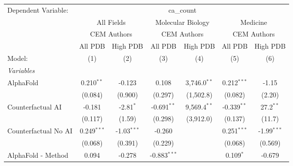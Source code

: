 \begingroup
\centering
\begin{tabular}{lcccccc}
   \tabularnewline \midrule \midrule
   Dependent Variable: & \multicolumn{6}{c}{ca\_count}\\
 & \multicolumn{2}{c}{All Fields} & \multicolumn{2}{c}{Molecular Biology} & \multicolumn{2}{c}{Medicine} \\
\cmidrule(lr){2-3} \cmidrule(lr){4-5} \cmidrule(lr){6-7}
 & \multicolumn{2}{c}{CEM Authors} & \multicolumn{2}{c}{CEM Authors} & \multicolumn{2}{c}{CEM Authors} \\
\cmidrule(lr){2-3} \cmidrule(lr){4-5} \cmidrule(lr){6-7}
 & \multicolumn{1}{c}{All PDB} & \multicolumn{1}{c}{High PDB} & \multicolumn{1}{c}{All PDB} & \multicolumn{1}{c}{High PDB} & \multicolumn{1}{c}{All PDB} & \multicolumn{1}{c}{High PDB} \\
\cmidrule(lr){2-2} \cmidrule(lr){3-3} \cmidrule(lr){4-4} \cmidrule(lr){5-5} \cmidrule(lr){6-6} \cmidrule(lr){7-7}
   Model:                                                     & (1)           & (2)           & (3)            & (4)            & (5)            & (6)\\  
   \midrule
   \emph{Variables}\\
   AlphaFold                                                  & 0.210$^{**}$  & -0.123        & 0.108          & 3,746.0$^{**}$ & 0.212$^{***}$  & -1.15\\   
                                                              & (0.084)       & (0.900)       & (0.297)        & (1,502.8)      & (0.082)        & (2.20)\\   
   Counterfactual AI                                          & -0.181        & -2.81$^{*}$   & -0.691$^{**}$  & 9,569.4$^{**}$ & -0.339$^{**}$  & 27.2$^{**}$\\   
                                                              & (0.117)       & (1.59)        & (0.298)        & (3,912.0)      & (0.137)        & (11.7)\\   
   Counterfactual No AI                                       & 0.249$^{***}$ & -1.03$^{***}$ & -0.260         &                & 0.251$^{***}$  & -1.99$^{***}$\\   
                                                              & (0.068)       & (0.391)       & (0.229)        &                & (0.068)        & (0.569)\\   
   AlphaFold - Method                                         & 0.094         & -0.278        & -0.883$^{***}$ &                & 0.109$^{*}$    & -0.679\\   

\end{tabular}
